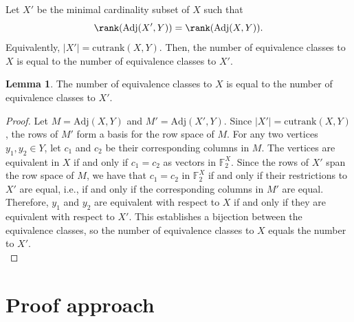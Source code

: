 \documentclass{article}
\theoremstyle{definition}
\newtheorem{lemma}[theorem]{Lemma}
\begin{document}
\noindent Let $X'$ be the minimal cardinality subset of $X$ such that \[\rank(\mathrm{Adj}(X',Y)) = \rank(\mathrm{Adj}(X,Y)).\] Equivalently, $|X'| = \mathrm{cutrank}(X,Y)$. Then, the number of equivalence classes to $X$ is equal to the number of equivalence classes to $X'$.
\begin{lemma}\label{lemma: equivalence class vc}
    The number of equivalence classes to $X$ is equal to the number of equivalence classes to $X'$.
\end{lemma}

\begin{proof} 
Let $M = \mathrm{Adj}(X,Y)$ and $M' = \mathrm{Adj}(X',Y)$. Since $|X'| = \mathrm{cutrank}(X,Y)$, the rows of $M'$ form a basis for the row space of $M$. For any two vertices $y_1, y_2 \in Y$, let $c_1$ and $c_2$ be their corresponding columns in $M$. The vertices are equivalent in $X$ if and only if $c_1 = c_2$ as vectors in $\mathbb{F}_2^X$. Since the rows of $X'$ span the row space of $M$, we have that $c_1 = c_2$ in $\mathbb{F}_2^X$ if and only if their restrictions to $X'$ are equal, i.e., if and only if the corresponding columns in $M'$ are equal. Therefore, $y_1$ and $y_2$ are equivalent with respect to $X$ if and only if they are equivalent with respect to $X'$. This establishes a bijection between the equivalence classes, so the number of equivalence classes to $X$ equals the number to $X'$.\qedhere\\
\end{proof}
 


\section{Proof approach}
\label{sec: proof_approach}

\MainThm*
\end{document}
